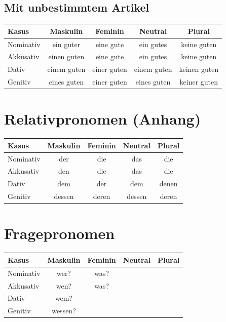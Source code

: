\subsection{Mit unbestimmtem Artikel}
\begin{center}
\begin{tabular}{|l|c|c|c|c|}
\hline
\textbf{Kasus} & \textbf{Maskulin} & \textbf{Feminin} & \textbf{Neutral} & \textbf{Plural} \\ \hline
Nominativ & ein guter & eine gute & ein gutes & keine guten \\ \hline
Akkusativ & einen guten & eine gute & ein gutes & keine guten \\ \hline
Dativ & einem guten & einer guten & einem guten & keinen guten \\ \hline
Genitiv & eines guten & einer guten & eines guten & keiner guten \\ \hline
\end{tabular}
\end{center}

\section{Relativpronomen (Anhang)}
\label{sec:RelativpronomenAnhang}

\begin{center}
\begin{tabular}{|l|c|c|c|c|}
\hline
\textbf{Kasus} & \textbf{Maskulin} & \textbf{Feminin} & \textbf{Neutral} & \textbf{Plural} \\ \hline
Nominativ & der & die & das & die \\ \hline
Akkusativ & den & die & das & die \\ \hline
Dativ & dem & der & dem & denen \\ \hline
Genitiv & dessen & deren & dessen & deren \\ \hline
\end{tabular}
\end{center}

\section{Fragepronomen}
\label{sec:Fragepronomen}

\begin{center}
\begin{tabular}{|l|c|c|c|c|}
\hline
\textbf{Kasus} & \textbf{Maskulin} & \textbf{Feminin} & \textbf{Neutral} & \textbf{Plural} \\ \hline
Nominativ & wer? & was? \\ \hline
Akkusativ & wen? & was? \\ \hline
Dativ & wem? \\ \hline
Genitiv & wessen? \\ \hline
\end{tabular}
\end{center}

